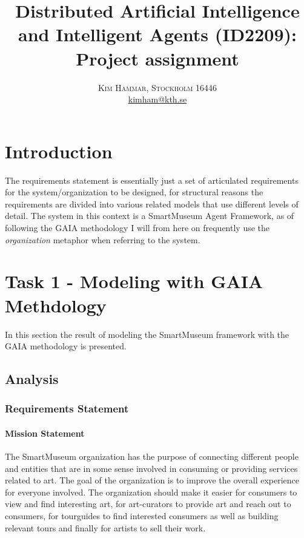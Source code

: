 \documentclass[paper=letter, fontsize=12pt]{article}
\title{\vspace{-15mm}\fontsize{24pt}{10pt}\selectfont\textbf{Distributed Artificial Intelligence and Intelligent Agents (ID2209): Project assignment}} %
\author{
\large
{\textsc{Kim Hammar, Stockholm 16446 }}\\[2mm]
\normalsize \href{mailto:kimham@kth.se}{kimham@kth.se}\\[2mm] %
}
\date{}
\begin{document}
\maketitle %
\thispagestyle{fancy} %


\section{Introduction}
The requirements statement is essentially just a set of articulated requirements for the system/organization to be designed, for structural reasons the requirements are divided into various related models that use different levels of detail. The system in this context is a SmartMuseum Agent Framework, as of following the GAIA methodology \citep{wooldrigde_jennings} I will from here on frequently use the \textit{organization} metaphor when referring to the system.
\section{Task 1 - Modeling with GAIA Methdology}
In this section the result of modeling the SmartMuseum framework with the GAIA methodology \citep{wooldrigde_jennings} is presented.
\subsection{Analysis}
\subsubsection{Requirements Statement}
\paragraph{Mission Statement}
The SmartMuseum organization has the purpose of connecting different people and entities that are in some sense involved in consuming or providing services related to art. The goal of the organization is to improve the overall experience for everyone involved. The organization should make it easier for consumers to view and find interesting art, for art-curators to provide art and reach out to consumers, for tourguides to find interested consumers as well as building relevant tours and finally for artists to sell their work.
\end{document}
